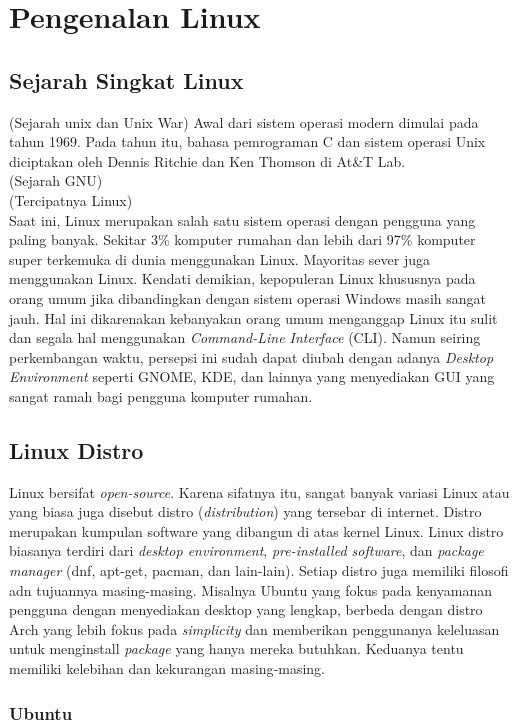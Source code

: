 \chapter{Pengenalan Linux}

\section{Sejarah Singkat Linux}
(Sejarah unix dan Unix War) Awal dari sistem operasi modern dimulai pada tahun 1969. Pada tahun itu, bahasa pemrograman C dan sistem operasi Unix diciptakan oleh Dennis Ritchie dan Ken Thomson di At\&T Lab. \\ 

(Sejarah GNU) \\ 

(Tercipatnya Linux) \\ 

Saat ini, Linux merupakan salah satu sistem operasi dengan pengguna yang paling banyak. Sekitar 3\% komputer rumahan dan lebih dari 97\% 
komputer super terkemuka di dunia menggunakan Linux. Mayoritas sever juga menggunakan Linux. Kendati demikian, kepopuleran Linux khususnya pada
orang umum jika dibandingkan dengan sistem operasi Windows masih sangat jauh. Hal ini dikarenakan kebanyakan orang umum menganggap Linux itu 
sulit dan segala hal menggunakan \textit{Command-Line Interface} (CLI). Namun seiring perkembangan waktu, persepsi ini sudah dapat diubah 
dengan adanya \textit{Desktop Environment} seperti GNOME, KDE, dan lainnya yang menyediakan GUI yang sangat ramah bagi pengguna 
komputer rumahan.\\

\section{Linux Distro}
Linux bersifat \textit{open-source}. Karena sifatnya itu, sangat banyak variasi Linux atau yang biasa juga disebut distro 
(\textit{distribution}) yang tersebar di internet. Distro merupakan kumpulan software yang dibangun di atas kernel Linux. Linux distro 
biasanya terdiri dari \textit{desktop environment}, \textit{pre-installed software}, dan \textit{package manager} (dnf, apt-get, pacman, 
dan lain-lain). Setiap distro juga memiliki filosofi adn tujuannya masing-masing. Misalnya Ubuntu yang fokus pada kenyamanan pengguna dengan 
menyediakan desktop yang lengkap, berbeda dengan distro Arch yang lebih fokus pada \textit{simplicity} dan memberikan penggunanya keleluasan 
untuk menginstall \textit{package} yang hanya mereka butuhkan. Keduanya tentu memiliki kelebihan dan kekurangan masing-masing. 

\subsection{Ubuntu}

